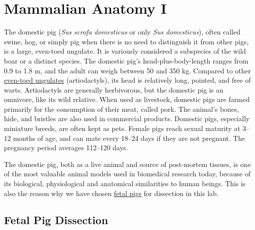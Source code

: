 \chapter{Mammalian Anatomy I}\label{mammalian-anatomy-i}

The domestic pig (\emph{Sus scrofa domesticus} or only \emph{Sus domesticus}), often called swine, hog, or simply pig when there is no need to distinguish it from other pigs, is a large, even-toed ungulate. It is variously considered a subspecies of the wild boar or a distinct species. The domestic pig's head-plus-body-length ranges from 0.9 to 1.8 m, and the adult can weigh between 50 and 350 kg. Compared to other \href{https://en.wikipedia.org/wiki/Even-toed_ungulate}{even-toed ungulates} (artiodactyls), its head is relatively long, pointed, and free of warts. Artiodactyls are generally herbivorous, but the domestic pig is an omnivore, like its wild relative. When used as livestock, domestic pigs are farmed primarily for the consumption of their meat, called pork. The animal's bones, hide, and bristles are also used in commercial products. Domestic pigs, especially miniature breeds, are often kept as pets. Female pigs reach sexual maturity at 3--12 months of age, and can mate every 18--24 days if they are not pregnant. The pregnancy period averages 112--120 days.


The domestic pig, both as a live animal and source of post-mortem tissues, is one of the most valuable animal models used in biomedical research today, because of its biological, physiological and anatomical similarities to human beings. This is also the reason why we have chosen \href{https://en.wikipedia.org/wiki/Fetal_pig}{fetal pigs} for dissection in this lab.


\section{Fetal Pig Dissection}\label{fetal-pig-dissection}

